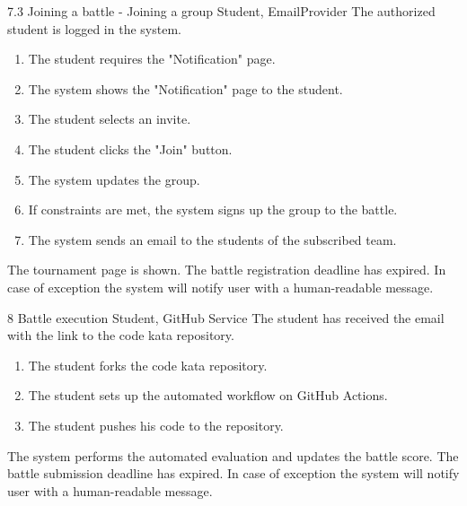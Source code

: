 \clearpage

\usecase
{7.3}
{Joining a battle - Joining a group}
{Student, EmailProvider}
{The authorized student is logged in the system.}
{
    \begin{enumerate}
        \item The student requires the "Notification" page.
        \item The system shows the "Notification" page to the student.
        \item The student selects an invite.
        \item The student clicks the "Join" button.
        \item The system updates the group.
        \item If constraints are met, the system signs up the group to the battle.
        \item The system sends an email to the students of the subscribed team.
    \end{enumerate}
}
{The tournament page is shown.}
{
    The battle registration deadline has expired.
}
{
    In case of exception the system will notify user with a human-readable message.
}


\usecase
{8}
{Battle execution}
{Student, GitHub Service}
{The student has received the email with the link to the code kata repository.}
{
    \begin{enumerate}
        \item The student forks the code kata repository.
        \item The student sets up the automated workflow on GitHub Actions.
        \item The student pushes his code to the repository.
    \end{enumerate}
}
{The system performs the automated evaluation and updates the battle score.}
{
    The battle submission deadline has expired.
}
{
    In case of exception the system will notify user with a human-readable message.
}

